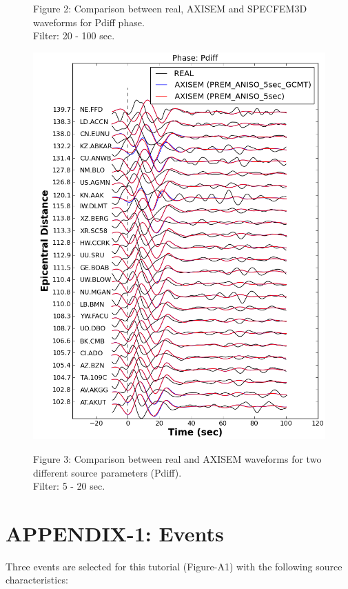 \documentclass{article}
\begin{document}
\begin{figure}[H]
\begin{minipage}{.5\textwidth}
{\small{}Figure 2: Comparison between real, AXISEM and SPECFEM3D waveforms for 
Pdiff phase. \\ Filter: 20 - 100 sec.}
\end{minipage}%
\begin{minipage}{.5\textwidth}
  \centering
  \includegraphics[width=0.9\linewidth]{AXISEMTutorial-fig014.png}

{\small{}Figure 3: Comparison between real and AXISEM waveforms for two different 
source parameters (Pdiff). \\ Filter: 5 - 20 sec.}
\end{minipage}
\begin{center}
\end{center}
\end{figure}


\newpage
\appendix
\section{APPENDIX-1: Events}

Three events are selected for this tutorial (Figure-A1) with the following source 
characteristics:
\end{document}

